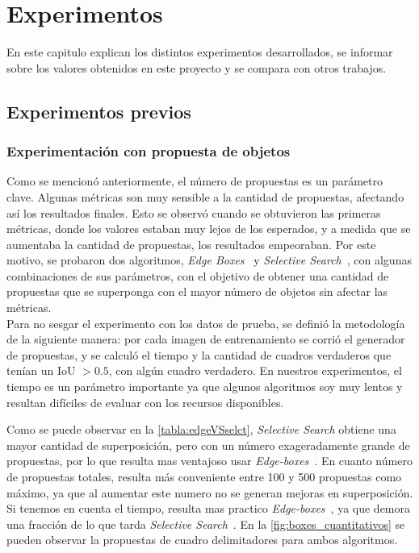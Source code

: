 \chapter{Experimentos}\label{cap:experimentos}

En este capitulo explican los distintos experimentos desarrollados, se informar sobre los valores obtenidos en este proyecto y se compara con otros trabajos. 


\section{Experimentos previos}

\subsection{Experimentación con propuesta de objetos} \label{ssec:experimentacionconpropuestadeobjetos}
Como se mencionó anteriormente, el número de propuestas es un parámetro clave. Algunas métricas son muy sensible a la cantidad de propuestas, afectando así los resultados finales. Esto se observó cuando se obtuvieron las primeras métricas, donde los valores estaban muy lejos de los esperados, y a medida que se aumentaba la cantidad de propuestas, los resultados empeoraban. Por este motivo, se probaron dos algoritmos, \textit{Edge Boxes}~\cite{zitnick2014edge} y \textit{Selective Search}~\cite{uijlings2013selective}, con algunas combinaciones de sus parámetros, con el objetivo de obtener una cantidad de propuestas que se superponga con el mayor número de objetos sin afectar las métricas.\\

Para no sesgar el experimento con los datos de prueba, se definió la metodología de la siguiente manera: por cada imagen de entrenamiento se corrió el generador de propuestas, y se calculó el tiempo y la cantidad de cuadros verdaderos que tenían un IoU $> 0.5$, con algún cuadro verdadero. En nuestros experimentos, el tiempo es un parámetro importante ya que algunos algoritmos soy muy lentos y resultan difíciles de evaluar con los recursos disponibles. 

Como se puede observar en la \autoref{tabla:edgeVSselct}, \textit{Selective Search} obtiene una mayor cantidad de superposición, pero con un número exageradamente grande de propuestas, por lo que resulta mas ventajoso usar \textit{Edge-boxes}~\cite{zitnick2014edge}. En cuanto número de propuestas totales, resulta más conveniente entre 100 y 500 propuestas como máximo, ya que al aumentar este numero no se generan mejoras en superposición. Si tenemos en cuenta el tiempo, resulta mas practico \textit{Edge-boxes}~\cite{zitnick2014edge}, ya que demora una fracción de lo que tarda \textit{Selective Search}~\cite{uijlings2013selective}. En la \autoref{fig:boxes_cuantitativos} se pueden observar la propuestas de cuadro delimitadores para ambos algoritmos.


